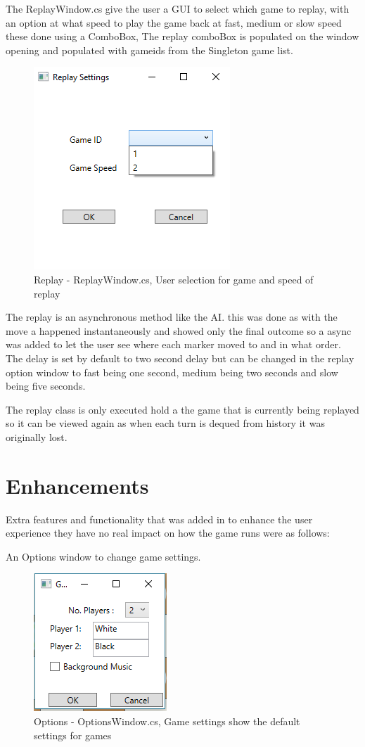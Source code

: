\documentclass[10pt, a4paper]{article}
\begin{document}
The ReplayWindow.cs give the user a GUI to select which game to replay, with an option at what speed to play the game back at fast, medium or slow speed these done using a ComboBox, The replay comboBox is populated on the window opening and populated with gameids from the Singleton game list.
 \begin{figure}[H]
  	\centering
  	\includegraphics[scale = 0.5]{ReplayWindow}
	\caption{Replay - ReplayWindow.cs, User selection for game and speed of replay}
  	\label{fig:nonfloat}
	\end{figure}

The replay is an asynchronous method like the AI. this was done as with the move a happened instantaneously and showed only the final outcome so a async was added to let the user see where each marker moved to and in what order. The delay is set by default to  two second delay but can be changed in the replay option window to fast being one second, medium being two seconds and slow being five seconds.

The replay class is only executed hold a the game that is currently being replayed so it can be viewed again as when each turn is dequed from history it was originally lost.

	
	\section{Enhancements}
Extra features and functionality that was added in to enhance the user experience they have no real impact on how the game runs were as follows:

An Options window to change game settings.
\begin{figure}[H]
  	\centering
  	\includegraphics[scale = 0.5]{Options}
	\caption{Options - OptionsWindow.cs, Game settings show the default settings for games}
  	\label{fig:nonfloat}
	\end{figure}
\end{document}
